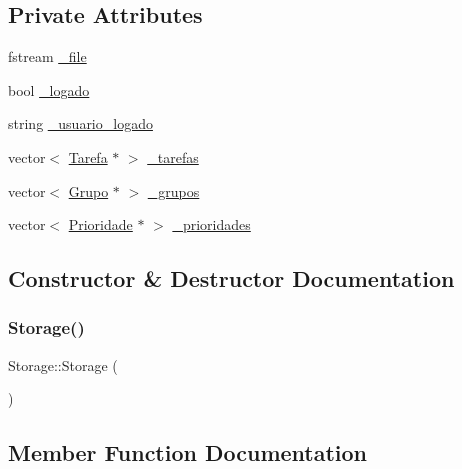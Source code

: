\subsection*{Private Attributes}
\begin{DoxyCompactItemize}
\item 
fstream \hyperlink{classStorage_ad9934ed8b6423a91135819a7f301ffba}{\+\_\+file}
\item 
bool \hyperlink{classStorage_afb88caad0d6b81083c03169d39718f81}{\+\_\+logado}
\item 
string \hyperlink{classStorage_a2c715507a5c7b44e912a827faf310dc8}{\+\_\+usuario\+\_\+logado}
\item 
vector$<$ \hyperlink{classTarefa}{Tarefa} $\ast$ $>$ \hyperlink{classStorage_a289eb400729d4db505aa427cdcd83fdf}{\+\_\+tarefas}
\item 
vector$<$ \hyperlink{classGrupo}{Grupo} $\ast$ $>$ \hyperlink{classStorage_a4bd9a86ddbe7dd8d4f2a2b0fe60255e6}{\+\_\+grupos}
\item 
vector$<$ \hyperlink{classPrioridade}{Prioridade} $\ast$ $>$ \hyperlink{classStorage_a1cd2e4e622c1e7988c8bc52f2a56f869}{\+\_\+prioridades}
\end{DoxyCompactItemize}


\subsection{Constructor \& Destructor Documentation}
\mbox{\label{classStorage_a80ef6af5e4c9fd4424ae16e808d05291}} 
\subsubsection{\texorpdfstring{Storage()}{Storage()}}
{\footnotesize\ttfamily Storage\+::\+Storage (\begin{DoxyParamCaption}{ }\end{DoxyParamCaption})}



\subsection{Member Function Documentation}
\mbox{\label{classStorage_acd2ad4c9120d2968cb811be2d96ce7ea}} 
